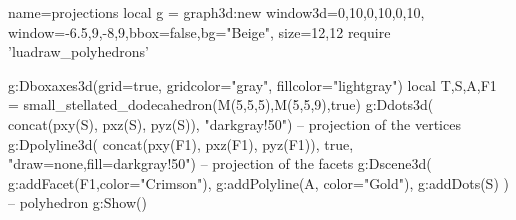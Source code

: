 \documentclass[border=5pt]{standalone}%
\begin{document}
\begin{luadraw}{name=projections}
local g = graph3d:new{ window3d={0,10,0,10,0,10}, window={-6.5,9,-8,9},bbox=false,bg="Beige", size={12,12}}
require 'luadraw_polyhedrons'

g:Dboxaxes3d({grid=true, gridcolor="gray", fillcolor="lightgray"})
local T,S,A,F1 = small_stellated_dodecahedron(M(5,5,5),M(5,5,9),true)
g:Ddots3d( concat(pxy(S), pxz(S), pyz(S)), "darkgray!50") -- projection of the vertices
g:Dpolyline3d( concat(pxy(F1), pxz(F1), pyz(F1)), true, "draw=none,fill=darkgray!50") -- projection of the facets
g:Dscene3d( g:addFacet(F1,{color="Crimson"}), g:addPolyline(A, {color="Gold"}), g:addDots(S) ) -- polyhedron
g:Show()
\end{luadraw}
\end{document}
